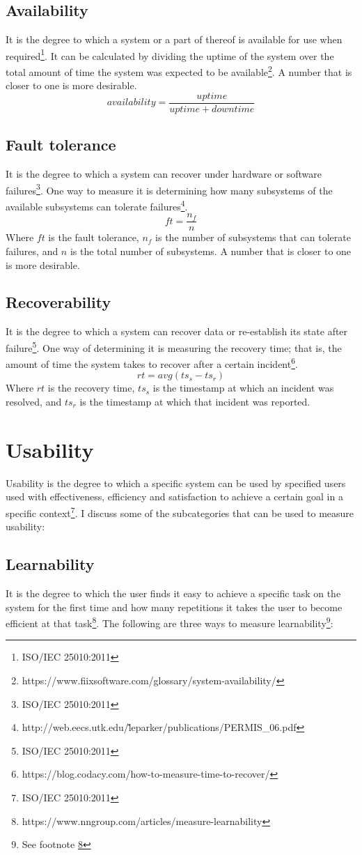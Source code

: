 \documentclass[11pt,a4paper]{article}
\def \iso{\footnote{ISO/IEC 25010:2011}}
\begin{document}
\subsection{Availability}
It is the degree to which a system or a part of thereof is available for use when required\iso. It can be calculated by
dividing the uptime of the system over the total amount of time the system was expected to be
available\footnote{https://www.fiixsoftware.com/glossary/system-availability/}. A number that is closer to one is more
desirable.
\[availability = \frac{uptime}{uptime + downtime}\]

\subsection{Fault tolerance}
It is the degree to which a system can recover under hardware or software failures\iso.
One way to measure it is determining how many subsystems of the available subsystems
can tolerate failures\footnote{http://web.eecs.utk.edu/\~leparker/publications/PERMIS\_06.pdf}.
\[ft = \frac{n_f}{n}\]
Where $ft$ is the fault tolerance, $n_f$ is the number of subsystems that can tolerate failures,
and $n$ is the total number of subsystems. A number that is closer to one is more desirable.

\subsection{Recoverability}
It is the degree to which a system can recover data or re-establish its state after failure\iso.
One way of determining it is measuring the recovery time;
that is, the amount of time the system takes to recover after a certain
incident\footnote{https://blog.codacy.com/how-to-measure-time-to-recover/}.
\[rt = avg(ts_s - ts_r)\]
Where $rt$ is the recovery time, $ts_s$ is the timestamp at which an incident was resolved,
and $ts_r$ is the timestamp at which that incident was reported.

\section{Usability}
Usability is the degree to which a specific system can be used by specified users used with
effectiveness, efficiency and satisfaction to achieve a certain goal in a specific context\iso.
I discuss some of the subcategories that can be used to measure usability:

\subsection{Learnability}
It is the degree to which the user finds it easy to achieve a specific task on the system for the first time and
how many repetitions it takes the user to become efficient at that
task\footnote{\label{measure_learnability}https://www.nngroup.com/articles/measure-learnability}.
The following are three ways to measure
learnability\footnote{See footnote \ref{measure_learnability}}:
\end{document}
